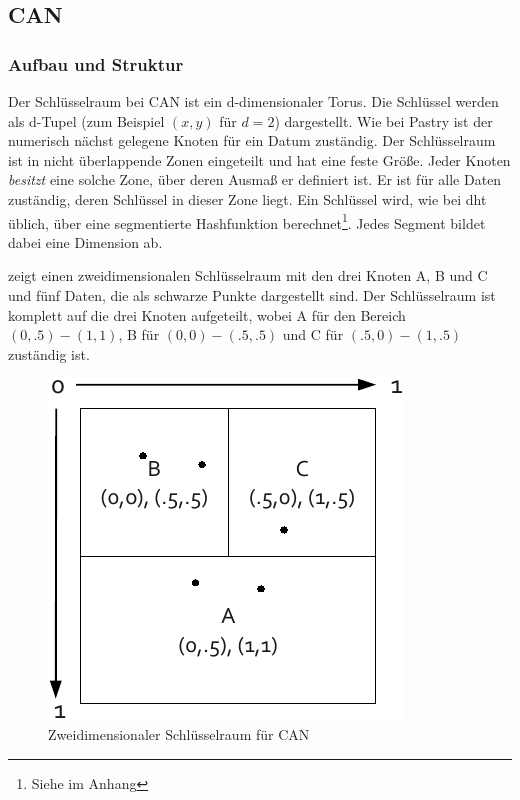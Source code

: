 \subsection{CAN}
\label{chap:evaluation_can}

\subsubsection{Aufbau und Struktur}
Der Schlüsselraum bei CAN \cite{Ratnasamy2001Scalable} ist ein d-dimensionaler Torus. Die Schlüssel werden als d-Tupel (zum Beispiel $(x,y)$ für $d=2$) dargestellt. Wie bei Pastry ist der numerisch nächst gelegene Knoten für ein Datum zuständig. Der Schlüsselraum ist in nicht überlappende Zonen eingeteilt und hat eine feste Größe. Jeder Knoten \emph{besitzt} eine solche Zone, über deren Ausmaß er definiert ist. Er ist für alle Daten zuständig, deren Schlüssel in dieser Zone liegt. Ein Schlüssel wird, wie bei \ac{dht} üblich, über eine segmentierte Hashfunktion berechnet\footnote{Siehe  im Anhang}. Jedes Segment bildet dabei eine Dimension ab.

 zeigt einen zweidimensionalen Schlüsselraum mit den drei Knoten A, B und C und fünf Daten, die als schwarze Punkte dargestellt sind. Der Schlüsselraum ist komplett auf die drei Knoten aufgeteilt, wobei A für den Bereich $(0, .5)-(1, 1)$, B für $(0, 0)-(.5, .5)$ und C für $(.5, 0)-(1, .5)$ zuständig ist.

\begin{figure}[htbp]
\centering
\includegraphics{grafics/can_key_space.pdf}
\caption{Zweidimensionaler Schlüsselraum für CAN}
\label{fig:can_key_space}
\end{figure}

